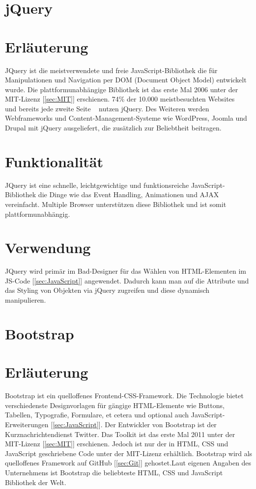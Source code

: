 \newpage
\clearpage

\section{jQuery}
\cite{jQuery}
\section*{Erläuterung}
JQuery ist die meistverwendete und freie JavaScript-Bibliothek die für Manipulationen und Navigation per DOM (Document Object Model) entwickelt wurde. Die plattformunabhängige Bibliothek ist das erste Mal 2006 unter der MIT-Lizenz [\ref{sec:MIT}] erschienen. 74\% der 10.000 meistbesuchten Websites ~\cite{jQuery_Usage01} und bereits jede zweite Seite ~\cite{jQuery_Usage02}  nutzen jQuery. Des Weiteren werden Webframeworks und Content-Management-Systeme wie WordPress, Joomla und Drupal mit jQuery ausgeliefert, die zusätzlich zur Beliebtheit beitragen. 

\section*{Funktionalität}
JQuery ist eine schnelle, leichtgewichtige und funktionsreiche JavaScript-Bibliothek die Dinge wie das Event Handling, Animationen und AJAX vereinfacht. Multiple Browser unterstützen diese Bibliothek und ist somit plattformunabhängig.

\section*{Verwendung}
JQuery wird primär im Bad-Designer für das Wählen von HTML-Elementen im JS-Code [\ref{sec:JavaScript}] angewendet. Dadurch kann man auf die Attribute und das Styling von Objekten via jQuery zugreifen und diese dynamisch manipulieren. 

\newpage
\clearpage

\section{Bootstrap}
\cite{BootStrap_Website} \cite{BootStrap_About}
\section*{Erläuterung}
Bootstrap ist ein quelloffenes Frontend-CSS-Framework. Die Technologie bietet verschiedenste Designvorlagen für gängige HTML-Elemente wie Buttons, Tabellen, Typografie, Formulare, et cetera  und optional auch JavaScript-Erweiterungen [\ref{sec:JavaScript}]. Der Entwickler von Bootstrap ist der Kurznachrichtendienst Twitter. Das Toolkit ist das erste Mal 2011 unter der MIT-Lizenz [\ref{sec:MIT}] erschienen. Jedoch ist nur der in HTML, CSS und JavaScript geschriebene Code unter der MIT-Lizenz erhältlich. Bootstrap wird als quelloffenes Framework auf GitHub [\ref{sec:Git}] gehostet.Laut eigenen Angaben des Unternehmens ist Bootstrap die beliebteste HTML, CSS und JavaScript Bibliothek der Welt.

